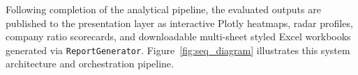 Following completion of the analytical pipeline, the evaluated outputs are published to the presentation layer as interactive Plotly heatmaps, radar profiles, company ratio scorecards, and downloadable multi-sheet styled Excel workbooks generated via \texttt{ReportGenerator}. Figure~\ref{fig:seq_diagram} illustrates this system architecture and orchestration pipeline.


\providecommand{\pipebox}[5]{%
  {\fontsize{9.5}{11}\selectfont\textbf{#1}}\par\vspace{4.5pt}%
  {\fontsize{8}{10.5}\selectfont
    \textbullet~#2\par
    \textbullet~#3\par
    \textbullet~#4\par
    \textbullet~#5\par
  }%
}

